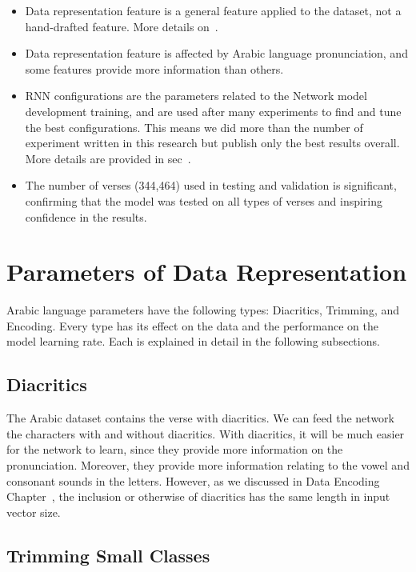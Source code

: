 \begin{itemize}
 \item Data representation feature is a general feature applied to the dataset, not a hand-drafted feature. More details on~.
 \item Data representation feature is affected by Arabic language pronunciation, and some features provide more information than others.
 \item RNN configurations are the parameters related to the Network model development training, and are used after many experiments to find and tune the best configurations. This means we did more than the number of experiment written in this research but publish only the best results overall. More details are provided in sec~.
 \item The number of verses (344,464) used in testing and validation is significant, confirming that the model was tested on all types of verses and inspiring confidence in the results.

\end{itemize}

\section{Parameters of Data Representation}\label{Sec:Data_Rep_Param}

Arabic language parameters have the following types: Diacritics, Trimming, and Encoding. Every type has its effect on the data and the performance on the model learning rate. Each is explained in detail in the following subsections.

\subsection{Diacritics}

The Arabic dataset contains the verse with diacritics. We can feed the network the characters with and without diacritics. With diacritics, it will be much easier for the network to learn, since they provide more information on the pronunciation. Moreover, they provide more information relating to the vowel and consonant sounds in the letters. However, as we discussed in Data Encoding Chapter~, the inclusion or otherwise of diacritics has the same length in input vector size.


\subsection{Trimming Small Classes}

